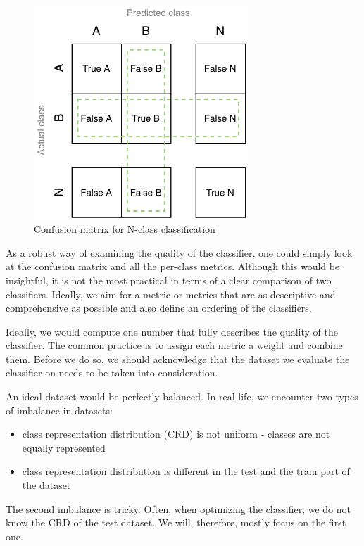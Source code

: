 \begin{figure}[h]\centering
\includegraphics[width=80mm]{./img//Diplomka diagramy-Big Confusion matric}
\caption{Confusion matrix for N-class classification}
\label{obr:BigCM}
\end{figure}






As a robust way of examining the quality of the classifier, one could simply look at the confusion matrix and all the per-class metrics. Although this would be insightful, it is not the most practical in terms of a clear comparison of two classifiers. Ideally, we aim for a metric or metrics that are as descriptive and comprehensive as possible and also define an ordering of the classifiers.

Ideally, we would compute one number that fully describes the quality of the classifier. The common practice is to assign each metric a weight and combine them. Before we do so, we should acknowledge that the dataset we evaluate the classifier on needs to be taken into consideration.

An ideal dataset would be perfectly balanced. In real life, we encounter two types of imbalance in datasets:

\begin{itemize}
\item class representation distribution (CRD) is not uniform - classes are not equally represented 

\item class representation distribution is different in the test and the train part of the dataset
\end{itemize}
The second imbalance is tricky. Often, when optimizing the classifier, we do not know the CRD of the test dataset. We will, therefore, mostly focus on the first one. 



